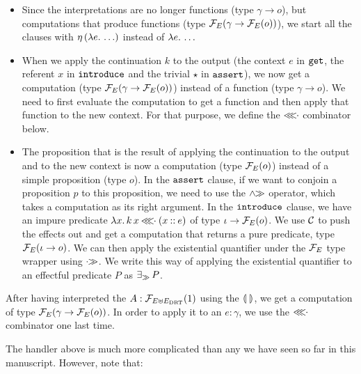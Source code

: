 \begin{itemize}
\item Since the interpretations are no longer functions (type
  $\gamma \to o$), but computations that produce functions (type
  $\mathcal{F}_E(\gamma \to \mathcal{F}_E(o))$), we start all the clauses with
  $\eta\,(\lambda e.\, \ldots)$ instead of $\lambda e.\, \ldots$
\item When we apply the continuation $k$ to the output (the context $e$ in
  $\mathtt{get}$, the referent $x$ in $\mathtt{introduce}$ and the trivial $\star$
  in $\mathtt{assert}$), we now get a computation (type
  $\mathcal{F}_E(\gamma \to \mathcal{F}_E(o))$) instead of a function (type
  $\gamma \to o$). We need to first evaluate the computation to get a
  function and then apply that function to the new context. For that
  purpose, we define the $\mathbin{\lll\!\!\cdot}$ combinator below.
\item The proposition that is the result of applying the continuation to
  the output and to the new context is now a computation (type $\mathcal{F}_E(o)$)
  instead of a simple proposition (type $o$). In the $\mathtt{assert}$ clause,
  if we want to conjoin a proposition $p$ to this proposition, we need to
  use the $\mathbin{\land\!\!\gg}$ operator, which takes a computation as its right
  argument. In the $\mathtt{introduce}$ clause, we have an impure predicate
  $\lambda x.\, k\,x \mathbin{\lll\!\!\cdot} (x \mathbin{::} e)$ of type $\iota \to \mathcal{F}_E(o)$. We
  use $\mathcal{C}$ to push the effects out and get a computation that returns a
  pure predicate, type $\mathcal{F}_E(\iota \to o)$. We can then apply the
  existential quantifier under the $\mathcal{F}_E$ type wrapper using $\mathbin{\cdot\!\!\gg}$. We
  write this way of applying the existential quantifier to an effectful
  predicate $P$ as $\mathop{\exists_\gg} P$.
\end{itemize}

After having interpreted the $A : \mathcal{F}_{E \uplus E_{\mathrm{DRT}}}(1)$ using the
$\llparenthesis \,  \, \rrparenthesis$, we get a computation of type $\mathcal{F}_E(\gamma \to \mathcal{F}_E(o))$. In
order to apply it to an $e : \gamma$, we use the $\mathbin{\lll\!\!\cdot}$ combinator one
last time.

The handler above is much more complicated than any we have seen so far in
this manuscript. However, note that:

